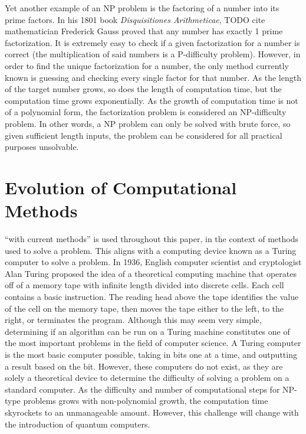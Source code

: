 \documentclass[10pt,journal,compsoc]{IEEEtran}
\begin{document}
Yet another example of an NP problem is the factoring of a number into its prime factors. In his 1801 book \textit{Disquisitiones Arithmeticae}, TODO cite mathematician Frederick Gauss proved that any number has exactly 1 prime factorization. It is extremely easy to check if a given factorization for a number is correct (the multiplication of said numbers is a P-difficulty problem). However, in order to find the unique factorization for a number, the only method currently known is guessing and checking every single factor for that number. As the length of the target number grows, so does the length of computation time, but the computation time grows exponentially. As the growth of computation time is not of a polynomial form, the factorization problem is considered an NP-difficulty problem. In other words, a NP problem can only be solved with brute force, so given sufficient length inputs, the problem can be considered for all practical purposes unsolvable.



\section{Evolution of Computational Methods}
  ``with current methods'' is used throughout this paper, in the context of methods used to solve a problem. This aligns with a computing device known as a Turing computer to solve a problem.  In 1936, English computer scientist and cryptologist Alan Turing proposed the idea of a theoretical computing machine that operates off of a memory tape with infinite length divided into discrete cells\cite{Turing}. Each cell contains a basic instruction. The reading head above the tape identifies the value of the cell on the memory tape, then moves the tape either to the left, to the right, or terminates the program. Although this may seem very simple, determining if an algorithm can be run on a Turing machine constitutes one of the most important problems in the field of computer science. A Turing computer is the most basic computer possible, taking in bits one at a time, and outputting a result based on the bit.  However, these computers do not exist, as they are solely a theoretical device to determine the difficulty of solving a problem on a standard computer. As the difficulty and number of computational steps for NP-type problems grows with non-polynomial growth, the computation time skyrockets to an unmanageable amount. However, this challenge will change with the introduction of quantum computers. 
\end{document}
